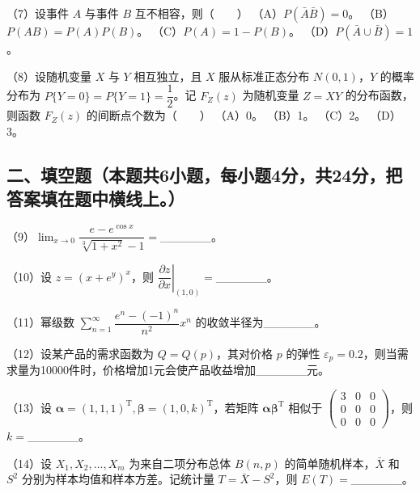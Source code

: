 \documentclass[UTF8,12pt]{ctexart}
\begin{document}
（7）设事件 \(\displaystyle A\) 与事件 \(\displaystyle B\) 互不相容，则（　　）
（A）\(\displaystyle P(\bar A\bar B)=0\)。 （B）\(\displaystyle P(AB)=P(A)P(B)\)。 （C）\(\displaystyle P(A)=1-P(B)\)。 （D）\(\displaystyle P(\bar A\cup\bar B)=1\)。


（8）设随机变量 \(\displaystyle X\) 与 \(\displaystyle Y\) 相互独立，且 \(\displaystyle X\) 服从标准正态分布 \(\displaystyle N(0,\allowbreak 1)\)，\(\displaystyle Y\) 的概率分布为 \(\displaystyle P\{Y=0\}=P\{Y=1\}=\dfrac{\displaystyle 1}{\displaystyle 2}\)。记 \(\displaystyle F_Z(z)\) 为随机变量 \(\displaystyle Z=XY\) 的分布函数，则函数 \(\displaystyle F_Z(z)\) 的间断点个数为（　　）
（A）0。 （B）1。 （C）2。 （D）3。


\subsection*{二、填空题（本题共6小题，每小题4分，共24分，把答案填在题中横线上。）}

（9）\(\displaystyle \lim_{x\to0}\dfrac{\displaystyle e-e^{\cos x}}{\displaystyle \sqrt[3]{1+x^2}-1}=\)\_\_\_\_\_\_。


（10）设 \(\displaystyle z=(x+e^y)^x\)，则 \(\displaystyle \left.\dfrac{\displaystyle \partial z}{\displaystyle \partial x}\right|_{(1,\allowbreak 0)}=\)\_\_\_\_\_\_。


（11）幂级数 \(\displaystyle \sum_{n=1}^{\infty}\dfrac{\displaystyle e^n-(-1)^n}{\displaystyle n^2}x^n\) 的收敛半径为\_\_\_\_\_\_。


（12）设某产品的需求函数为 \(\displaystyle Q=Q(p)\)，其对价格 \(\displaystyle p\) 的弹性 \(\displaystyle \varepsilon_p=0.2\)，则当需求量为10000件时，价格增加1元会使产品收益增加\_\_\_\_\_\_元。


（13）设 \(\displaystyle \boldsymbol\alpha=(1,\allowbreak 1,\allowbreak 1)^{\mathrm T},\allowbreak \boldsymbol\beta=(1,\allowbreak 0,\allowbreak k)^{\mathrm T}\)，若矩阵 \(\displaystyle \boldsymbol\alpha\boldsymbol\beta^{\mathrm T}\) 相似于 \(\displaystyle \begin{pmatrix}3&0&0\\0&0&0\\0&0&0\end{pmatrix}\)，则 \(\displaystyle k=\)\_\_\_\_\_\_。


（14）设 \(\displaystyle X_1,\allowbreak X_2,\allowbreak \ldots,\allowbreak X_m\) 为来自二项分布总体 \(\displaystyle B(n,\allowbreak p)\) 的简单随机样本，\(\displaystyle \bar X\) 和 \(\displaystyle S^2\) 分别为样本均值和样本方差。记统计量 \(\displaystyle T=\bar X-S^2\)，则 \(\displaystyle E(T)=\)\_\_\_\_\_\_。
\end{document}
